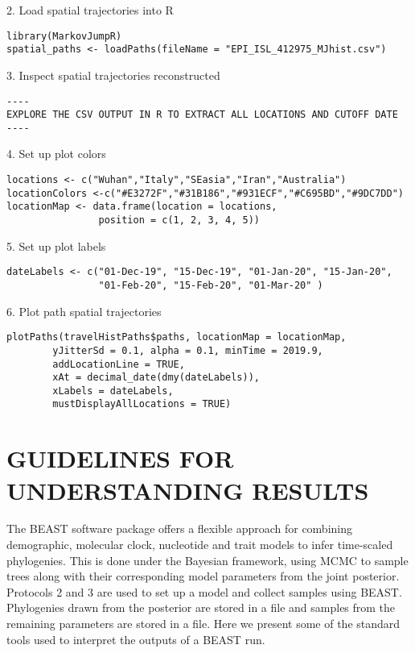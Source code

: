 \documentclass{article}
\newcommand{\code}[1]{
{\upshape\ttfamily{#1}}}
\begin{document}
2. Load spatial trajectories into R
\begin{verbatim}
library(MarkovJumpR)
spatial_paths <- loadPaths(fileName = "EPI_ISL_412975_MJhist.csv")
\end{verbatim}

3. Inspect spatial trajectories reconstructed
\begin{verbatim}
----
EXPLORE THE CSV OUTPUT IN R TO EXTRACT ALL LOCATIONS AND CUTOFF DATE
----
\end{verbatim}

4. Set up plot colors
\begin{verbatim}
locations <- c("Wuhan","Italy","SEasia","Iran","Australia")
locationColors <-c("#E3272F","#31B186","#931ECF","#C695BD","#9DC7DD")
locationMap <- data.frame(location = locations,
                position = c(1, 2, 3, 4, 5))
\end{verbatim}

5. Set up plot labels
\begin{verbatim}
dateLabels <- c("01-Dec-19", "15-Dec-19", "01-Jan-20", "15-Jan-20",
                "01-Feb-20", "15-Feb-20", "01-Mar-20" )
\end{verbatim}

6. Plot path spatial trajectories
\begin{verbatim}
plotPaths(travelHistPaths$paths, locationMap = locationMap,
        yJitterSd = 0.1, alpha = 0.1, minTime = 2019.9,
        addLocationLine = TRUE,
        xAt = decimal_date(dmy(dateLabels)),
        xLabels = dateLabels,
        mustDisplayAllLocations = TRUE)
\end{verbatim}

\section*{GUIDELINES FOR UNDERSTANDING RESULTS}

The BEAST software package offers a flexible approach for combining demographic, molecular clock, nucleotide and trait models to infer time-scaled phylogenies. This is done under the Bayesian framework, using MCMC to sample trees along with their corresponding model parameters from the joint posterior. Protocols 2 and 3 are used to set up a model and collect samples using BEAST. Phylogenies drawn from the posterior are stored in a \code{.trees} file and samples from the remaining parameters are stored in a \code{.log} file. Here we present some of the standard tools used to interpret the outputs of a BEAST run.
\end{document}

